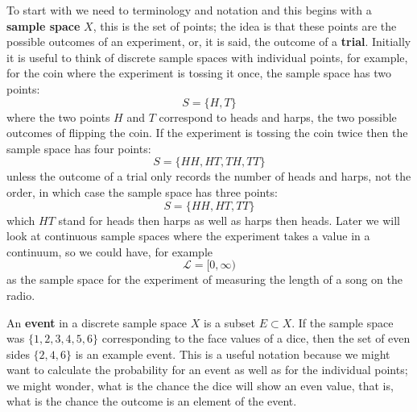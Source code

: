 \documentclass[11pt,a4paper]{scrartcl}
\begin{document}
To start with we need to terminology and notation and this begins with
a \textbf{sample space} $X$, this is the set of points; the idea is
that these points are the possible outcomes of an experiment, or, it
is said, the outcome of a \textbf{trial}. Initially it is useful to
think of discrete sample spaces with individual points, for example,
for the coin where the experiment is tossing it once, the sample space
has two points:
\begin{equation}
S=\{H,T\}
\end{equation}
where the two points $H$ and $T$ correspond to heads and harps, the
two possible outcomes of flipping the coin. If the experiment is
tossing the coin twice then the sample space has four points:
\begin{equation}
S=\{HH,HT,TH,TT\}
\end{equation}
unless the outcome of a trial only records the number of heads and
harps, not the order, in which case the sample space has three points:
\begin{equation}
S=\{HH,HT,TT\}
\end{equation}
which $HT$ stand for heads then harps as well as harps then
heads. Later we will look at continuous sample spaces where the
experiment takes a value in a continuum, so we could have, for example
\begin{equation}
\mathcal{L}=[0,\infty)
\end{equation}
as the sample space for the experiment of measuring the length of a
song on the radio.

An \textbf{event} in a discrete sample space $X$ is a subset
$E\subset X$. If the sample space was $\{1,2,3,4,5,6\}$ corresponding to the
face values of a dice, then the set of even sides $\{2,4,6\}$ is an
example event. This is a useful notation because we might want to
calculate the probability for an event as well as for the individual
points; we might wonder, what is the chance the dice will show an even
value, that is, what is the chance the outcome is an element of the
event.
\end{document}
